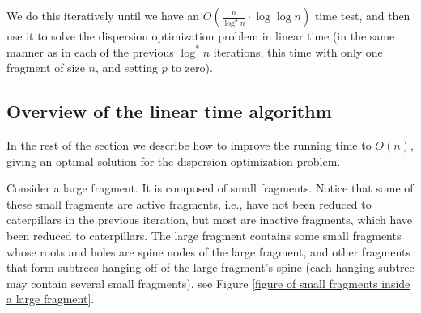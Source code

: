 \documentclass[a4paper,UKenglish]{lipics-v2016}
\theoremstyle{plain}
\begin{document}
We do this iteratively until we have an $O(\frac{n}{\log ^3n} \cdot \log \log n)$ time test, and then use it to
solve the dispersion optimization problem in linear time (in the same manner as in each of the previous
$\log ^*n$ iterations, this time with only one fragment of size $n$, and setting $p$ to zero).

\subsection{Overview of the linear time algorithm}
In the rest of the section we describe how to improve the running time to $O(n)$, giving an optimal solution for the dispersion optimization problem.

Consider a large fragment. It is composed of small fragments. Notice that some of these small fragments are active fragments, i.e., have not been reduced to caterpillars in the previous iteration, but most are inactive fragments, which have
been reduced to caterpillars. The large fragment contains some small fragments whose roots and holes are spine nodes of the large fragment,
and other fragments that form subtrees hanging off of the large fragment's spine (each hanging subtree may
contain several small fragments), see Figure \ref{figure of small fragments inside a large fragment}.
\end{document}
